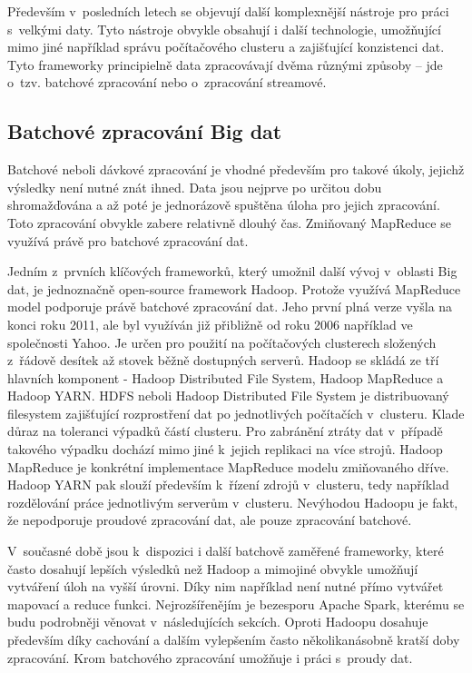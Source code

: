\documentclass[thesis=B,czech]{FITthesis}[2012/06/26]
\begin{document}
	Především v~posledních letech se objevují další komplexnější nástroje pro práci s~velkými daty. Tyto nástroje obvykle obsahují i další technologie, umožňující mimo jiné například správu počítačového clusteru a zajišťující konzistenci dat. Tyto frameworky principielně data zpracovávají dvěma různými způsoby -- jde o~tzv. batchové zpracování nebo o~zpracování streamové. 
	
\subsection{Batchové zpracování Big dat}
	Batchové neboli dávkové zpracování je vhodné především pro takové úkoly, jejichž výsledky není nutné znát ihned. Data jsou nejprve po určitou dobu shromažďována a až poté je jednorázově spuštěna úloha pro jejich zpracování. Toto zpracování obvykle zabere relativně dlouhý čas. Zmiňovaný MapReduce se využívá právě pro batchové zpracování dat. 

	Jedním z~prvních klíčových frameworků, který umožnil další vývoj v~oblasti Big dat, je jednoznačně open-source framework Hadoop\cite{hadoop-home}. Protože využívá MapReduce model podporuje právě batchové zpracování dat. Jeho první plná verze vyšla na konci roku 2011, ale byl využíván již přibližně od roku 2006 například ve společnosti Yahoo\cite{hadoop-history}. Je určen pro použití na počítačových clusterech složených z~řádově desítek až stovek běžně dostupných serverů. Hadoop se skládá ze tří hlavních komponent - Hadoop Distributed File System, Hadoop MapReduce a Hadoop YARN. HDFS neboli Hadoop Distributed File System je distribuovaný filesystem zajišťující rozprostření dat po jednotlivých počítačích v~clusteru. Klade důraz na toleranci výpadků částí clusteru. Pro zabránění ztráty dat v~případě takového výpadku dochází mimo jiné k~jejich replikaci na více strojů. Hadoop MapReduce je konkrétní implementace MapReduce modelu zmiňovaného dříve. Hadoop YARN pak slouží především k~řízení zdrojů v~clusteru, tedy například rozdělování práce jednotlivým serverům v~clusteru. Nevýhodou Hadoopu je fakt, že nepodporuje proudové zpracování dat, ale pouze zpracování batchové. 
	
	V~současné době jsou k~dispozici i další batchově zaměřené frameworky, které často dosahují lepších výsledků než Hadoop a mimojiné obvykle umožňují vytváření úloh na vyšší úrovni. Díky nim například není nutné přímo vytvářet mapovací a reduce funkci. Nejrozšířenějím je bezesporu Apache Spark\cite{spark-home}, kterému se budu podrobněji věnovat v~následujících sekcích. Oproti \mbox{Hadoopu} dosahuje především díky cachování a dalším vylepšením často několikanásobně kratší doby zpracování. Krom batchového zpracování umožňuje i práci s~proudy dat. 
\end{document}
